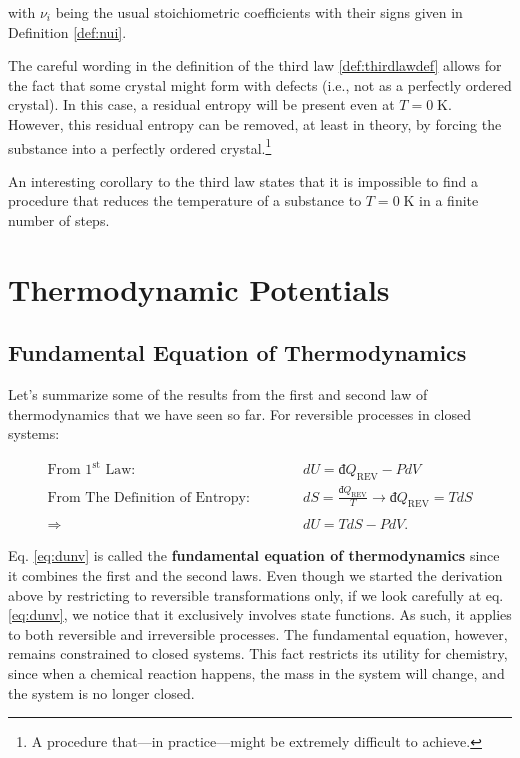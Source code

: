 \documentclass[
  9pt,
]{extbook}
\theoremstyle{definition}
\theoremstyle{definition}
\theoremstyle{definition}
\theoremstyle{remark}
\begin{document}
with \(\nu_i\) being the usual stoichiometric coefficients with their signs given in Definition \ref{def:nui}.

The careful wording in the definition of the third law \ref{def:thirdlawdef} allows for the fact that some crystal might form with defects (i.e., not as a perfectly ordered crystal). In this case, a residual entropy will be present even at \(T=0 \; \text{K}\). However, this residual entropy can be removed, at least in theory, by forcing the substance into a perfectly ordered crystal.\footnote{A procedure that---in practice---might be extremely difficult to achieve.}

An interesting corollary to the third law states that it is impossible to find a procedure that reduces the temperature of a substance to \(T=0 \; \text{K}\) in a finite number of steps.

\hypertarget{Potentials}{%
\chapter{Thermodynamic Potentials}\label{Potentials}}

\hypertarget{fundeq}{%
\section{Fundamental Equation of Thermodynamics}\label{fundeq}}

Let's summarize some of the results from the first and second law of thermodynamics that we have seen so far. For reversible processes in closed systems:

\begin{equation}
\begin{aligned}
\text{From 1}^{\text{st}} \text{ Law:} \qquad \quad & dU = đQ_{\mathrm{REV}}-PdV \\
\text{From The Definition of Entropy:} \qquad \quad & dS = \frac{đQ_{\mathrm{REV}}}{T} \rightarrow đQ_{\mathrm{REV}} = TdS \\
\\
\Rightarrow \quad & dU = TdS - PdV.
\end{aligned}
\label{eq:dunv}
\end{equation}

Eq. \eqref{eq:dunv} is called the \textbf{fundamental equation of thermodynamics} since it combines the first and the second laws. Even though we started the derivation above by restricting to reversible transformations only, if we look carefully at eq. \eqref{eq:dunv}, we notice that it exclusively involves state functions. As such, it applies to both reversible and irreversible processes. The fundamental equation, however, remains constrained to closed systems. This fact restricts its utility for chemistry, since when a chemical reaction happens, the mass in the system will change, and the system is no longer closed.
\end{document}
